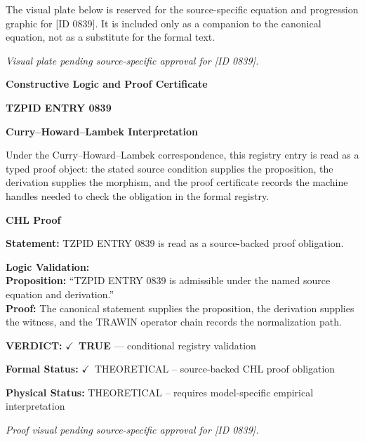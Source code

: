 \begingroup\footnotesize\sloppy
The visual plate below is reserved for the source-specific equation and progression graphic for [ID 0839]. It is included only as a companion to the canonical equation, not as a substitute for the formal text.
\par\endgroup
\begingroup\footnotesize\itshape
Visual plate pending source-specific approval for [ID 0839].
\par\endgroup

\clearpage
\begingroup\tzpsupportsetup
\noindent\textbf{\fontsize{10.8pt}{12.8pt}\selectfont [ID 0839] Constructive Logic and Proof Certificate}\par
\noindent\textbf{\fontsize{10pt}{12pt}\selectfont TZPID ENTRY 0839}\par
\vspace{0.45em}
\begingroup
\footnotesize
\setlength{\parskip}{0.22em}
\setlength{\parindent}{0pt}
\noindent\textbf{Curry--Howard--Lambek Interpretation}\par
Under the Curry--Howard--Lambek correspondence, this registry entry is read as a typed proof
object: the stated source condition supplies the proposition, the derivation supplies the
morphism, and the proof certificate records the machine handles needed to check the obligation
in the formal registry.

\vspace{0.45em}
\noindent\textbf{CHL Proof}\par
\textbf{Statement:} TZPID ENTRY 0839 is read as a source-backed proof obligation.

\textbf{Logic Validation:}\\
\textbf{Proposition:} ``TZPID ENTRY 0839 is admissible under the named source equation and derivation.''\\
\textbf{Proof:} The canonical statement supplies the proposition, the derivation supplies the witness, and the TRAWIN operator chain records the normalization path.

\textbf{VERDICT:} \ensuremath{\checkmark}\ \textbf{TRUE} --- conditional registry validation

\textbf{Formal Status:} \ensuremath{\checkmark}\ THEORETICAL -- source-backed CHL proof obligation

\textbf{Physical Status:} THEORETICAL -- requires model-specific empirical interpretation
\par\vspace{0.45em}
\par
\vfill
\begingroup\footnotesize\itshape
Proof visual pending source-specific approval for [ID 0839].
\par\endgroup
\vfill
\endgroup
\endgroup
